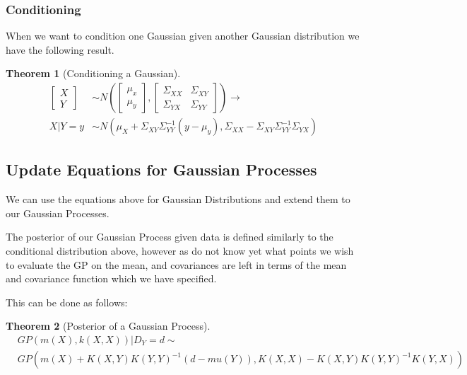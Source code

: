\documentclass[12pt, a4paper]{report}
\theoremstyle{definition}
\newtheorem{theorem}{Theorem}[section]
\theoremstyle{definition}
\theoremstyle{definition}
\begin{document}
\subsubsection{Conditioning}

When we want to condition one Gaussian given another Gaussian distribution we have the following result.


\begin{theorem}[Conditioning a Gaussian]
    \begin{align*}\begin{bmatrix}
        X \\ Y
    \end{bmatrix} &\sim N \left(\begin{bmatrix}
        \mu_x \\ 
        \mu_y
    \end{bmatrix}, \begin{bmatrix}
        \Sigma_{XX} & \Sigma_{XY} \\
        \Sigma_{YX} & \Sigma_{YY}
    \end{bmatrix} \right) \rightarrow \\ X | Y = y &\sim N \left(\mu_X +  \Sigma_{XY} \Sigma_{YY}^{-1} \left(y - \mu_y \right), \Sigma_{XX} - \Sigma_{XY} \Sigma_{YY}^{-1} \Sigma_{YX} \right)
\end{align*}
\end{theorem}


\subsection{Update Equations for Gaussian Processes}

We can use the equations above for Gaussian Distributions and extend them to our Gaussian Processes.

The posterior of our Gaussian Process given data is defined similarly to the conditional distribution above, however as do not know yet what points we wish to evaluate the GP on the mean, and covariances are left in terms of the mean and covariance function which we have specified.

This can be done as follows: 

\begin{theorem}[Posterior of a Gaussian Process]
\begin{align*} &GP\left( m\left(X\right), k \left(X,X\right) \right) | D_Y = d \sim \\ &GP \left( m(X) +  K(X,Y) K(Y,Y)^{-1} \left(d - mu(Y) \right),  K(X,X) - K(X,Y) K(Y,Y)^{-1} K(Y,X) \right)
\end{align*}
\end{theorem}
\end{document}
